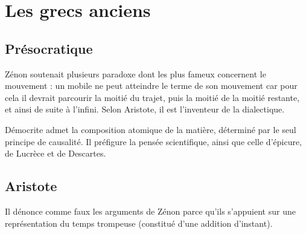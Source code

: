 
\section{Les grecs anciens}
%

%
\subsection{Présocratique}

Zénon soutenait plusieurs paradoxe dont les plus fameux concernent le mouvement : un mobile ne peut atteindre le terme de son mouvement car pour cela il devrait parcourir la moitié du trajet, puis la moitié de la moitié restante, et ainsi de suite à l'infini. Selon Aristote, il est l'inventeur de la dialectique.

Démocrite admet la composition atomique de la matière, déterminé par le seul principe de causalité. Il préfigure la pensée scientifique, ainsi que celle d'épicure, de Lucrèce et de Descartes.

\subsection{Aristote}
Il dénonce comme faux les arguments de Zénon parce qu'ils s'appuient sur une représentation du temps trompeuse (constitué d'une addition d'instant).

